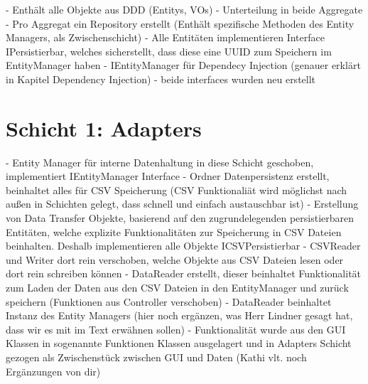 - Enthält alle Objekte aus DDD (Entitys, VOs)
- Unterteilung in beide Aggregate
- Pro Aggregat ein Repository erstellt (Enthält spezifische Methoden des Entity Managers, als Zwischenschicht)
- Alle Entitäten implementieren Interface IPersistierbar, welches sicherstellt, dass diese eine UUID zum Speichern im EntityManager haben
- IEntityManager für Dependecy Injection (genauer erklärt in Kapitel Dependency Injection)
- beide interfaces wurden neu erstellt



\section{Schicht 1: Adapters}


- Entity Manager für interne Datenhaltung in diese Schicht geschoben, implementiert IEntityManager Interface 
- Ordner Datenpersistenz erstellt, beinhaltet alles für CSV Speicherung (CSV Funktionaliät wird möglichst nach außen in Schichten gelegt, dass schnell und einfach austauschbar ist)
    - Erstellung von Data Transfer Objekte, basierend auf den zugrundelegenden persistierbaren Entitäten, welche explizite Funktionalitäten zur Speicherung in CSV Dateien beinhalten. Deshalb implementieren alle Objekte ICSVPersistierbar
    - CSVReader und Writer dort rein verschoben, welche Objekte aus CSV Dateien lesen oder dort rein schreiben können
    - DataReader erstellt, dieser beinhaltet Funktionalität zum Laden der Daten aus den CSV Dateien in den EntityManager und zurück speichern (Funktionen aus Controller verschoben) 
    - DataReader beinhaltet Instanz des Entity Managers
    (hier noch ergänzen, was Herr Lindner gesagt hat, dass wir es mit im Text erwähnen sollen)
- Funktionalität wurde aus den GUI Klassen in sogenannte Funktionen Klassen ausgelagert und in Adapters Schicht gezogen als Zwischenstück zwischen GUI und Daten (Kathi vlt. noch Ergänzungen von dir)



